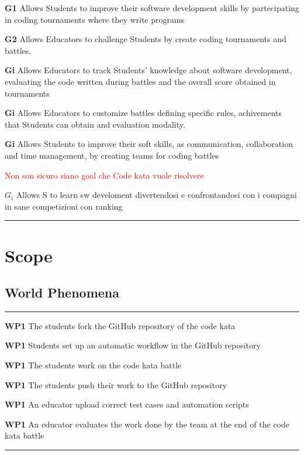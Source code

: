 \begin{description}
    \item \textbf{G1} \quad Allows Students to improve their software development skills by partecipating in coding tournaments where they write programs
    \item \textbf{G2} \quad Allows Educators to challenge Students by create coding tournaments and battles.
    \item \textbf{Gi} \quad Allows Educators to track Students' knowledge about software development, evaluating the code written during battles and the overall score obtained in tournaments
    \item \textbf{Gi} \quad Allows Educators to customize battles defining specific rules, achivements that Students can obtain and evaluation modality.
    \item \textbf{Gi} \quad Allows Students to improve their soft skills, as communication, collaboration and time management, by creating teams for coding battles
    \item {\textcolor{red}{Non son sicuro siano goal che Code kata vuole risolvere}}
    \item \(G_i\) Allows S to learn sw develoment divertendosi e confrontandosi con i compagni in sane competizioni con ranking
\end{description}
\par\noindent\rule{\textwidth}{0.5pt}

\blindtext
\section{Scope}

\subsection{World Phenomena}
\par\noindent\rule{\textwidth}{0.5pt}
\begin{description}
    \item \textbf{WP1} \quad The students fork the GitHub repository of the code kata
    \item \textbf{WP1} \quad Students set up an automatic workflow in the GitHub repository
    \item \textbf{WP1} \quad The students work on the code kata battle
    \item \textbf{WP1} \quad The students push their work to the GitHub repository
    \item \textbf{WP1} \quad An educator upload correct test cases and automation scripts
    \item \textbf{WP1} \quad An educator evaluates the work done by the team at the end of the code kata battle
\end{description}
\par\noindent\rule{\textwidth}{0.5pt}


